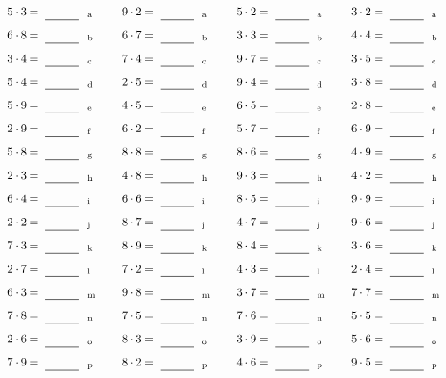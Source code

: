 \documentclass
[
  draft    = true,
  fontsize = 11pt,
  parskip  = half-
]
{scrartcl}
\begin{document}
\par\vfill\par
\begin{align*}
    \pline{5\cdot3}&=\rline{a}
  & \pline{9\cdot2}&=\rline{a}
  & \pline{5\cdot2}&=\rline{a}
  & \pline{3\cdot2}&=\rline{a} \\[1ex]
    \pline{6\cdot8}&=\rline{b}
  & \pline{6\cdot7}&=\rline{b}
  & \pline{3\cdot3}&=\rline{b}
  & \pline{4\cdot4}&=\rline{b} \\[1ex]
    \pline{3\cdot4}&=\rline{c}
  & \pline{7\cdot4}&=\rline{c}
  & \pline{9\cdot7}&=\rline{c}
  & \pline{3\cdot5}&=\rline{c} \\[1ex]
    \pline{5\cdot4}&=\rline{d}
  & \pline{2\cdot5}&=\rline{d}
  & \pline{9\cdot4}&=\rline{d}
  & \pline{3\cdot8}&=\rline{d} \\[1ex]
    \pline{5\cdot9}&=\rline{e}
  & \pline{4\cdot5}&=\rline{e}
  & \pline{6\cdot5}&=\rline{e}
  & \pline{2\cdot8}&=\rline{e} \\[1ex]
    \pline{2\cdot9}&=\rline{f}
  & \pline{6\cdot2}&=\rline{f}
  & \pline{5\cdot7}&=\rline{f}
  & \pline{6\cdot9}&=\rline{f} \\[1ex]
    \pline{5\cdot8}&=\rline{g}
  & \pline{8\cdot8}&=\rline{g}
  & \pline{8\cdot6}&=\rline{g}
  & \pline{4\cdot9}&=\rline{g} \\[1ex]
    \pline{2\cdot3}&=\rline{h}
  & \pline{4\cdot8}&=\rline{h}
  & \pline{9\cdot3}&=\rline{h}
  & \pline{4\cdot2}&=\rline{h} \\[1ex]
    \pline{6\cdot4}&=\rline{i}
  & \pline{6\cdot6}&=\rline{i}
  & \pline{8\cdot5}&=\rline{i}
  & \pline{9\cdot9}&=\rline{i} \\[1ex]
    \pline{2\cdot2}&=\rline{j}
  & \pline{8\cdot7}&=\rline{j}
  & \pline{4\cdot7}&=\rline{j}
  & \pline{9\cdot6}&=\rline{j} \\[1ex]
    \pline{7\cdot3}&=\rline{k}
  & \pline{8\cdot9}&=\rline{k}
  & \pline{8\cdot4}&=\rline{k}
  & \pline{3\cdot6}&=\rline{k} \\[1ex]
    \pline{2\cdot7}&=\rline{l}
  & \pline{7\cdot2}&=\rline{l}
  & \pline{4\cdot3}&=\rline{l}
  & \pline{2\cdot4}&=\rline{l} \\[1ex]
    \pline{6\cdot3}&=\rline{m}
  & \pline{9\cdot8}&=\rline{m}
  & \pline{3\cdot7}&=\rline{m}
  & \pline{7\cdot7}&=\rline{m} \\[1ex]
    \pline{7\cdot8}&=\rline{n}
  & \pline{7\cdot5}&=\rline{n}
  & \pline{7\cdot6}&=\rline{n}
  & \pline{5\cdot5}&=\rline{n} \\[1ex]
    \pline{2\cdot6}&=\rline{o}
  & \pline{8\cdot3}&=\rline{o}
  & \pline{3\cdot9}&=\rline{o}
  & \pline{5\cdot6}&=\rline{o} \\[1ex]
    \pline{7\cdot9}&=\rline{p}
  & \pline{8\cdot2}&=\rline{p}
  & \pline{4\cdot6}&=\rline{p}
  & \pline{9\cdot5}&=\rline{p}
\end{align*}
\end{document}
